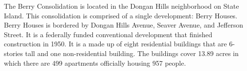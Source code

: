        

     

The Berry Consolidation is located in the Dongan Hills neighborhood on State Island. This consolidation is comprised of a single development: Berry Houses. Berry Houses is bordered by Dongan Hills Avenue, Seaver Avenue, and Jefferson Street. It is a federally funded conventional development that finished construction in 1950. It is a made up of eight residential buildings that are 6- stories tall and one non-residential building. The buildings cover 13.89 acres in which there are 499 apartments officially housing 957 people.   

 